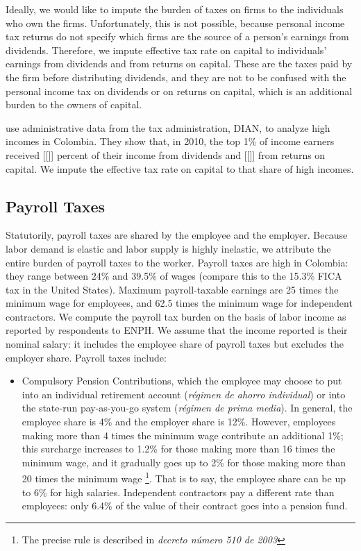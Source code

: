 \documentclass[12pt]{article}
\begin{document}
\begin{appendices}
Ideally, we would like to impute the burden of taxes on firms
to the individuals who own the firms.
Unfortunately, this is not possible,
because personal income tax returns do not specify
which firms are the source of a person's earnings from dividends.
Therefore, we impute effective tax rate on capital
to individuals' earnings from dividends and from returns on capital.
These are the taxes paid by the firm before distributing dividends,
and they are not to be confused with
the personal income tax on dividends or on returns on capital,
which is an additional burden to the owners of capital.

\citet{juliana} use administrative data from the tax administration, DIAN,
to analyze high incomes in Colombia.
They show that, in 2010, the top 1\% of income earners
received [[]] percent of their income from dividends
and [[]] from returns on capital.
We impute the effective tax rate on capital to that share of high incomes.

\subsection{Payroll Taxes}

Statutorily, payroll taxes are shared by the employee and the employer.
Because labor demand is elastic and labor supply is highly inelastic,
we attribute the entire burden of payroll taxes to the worker.
Payroll taxes are high in Colombia:
they range between 24\% and 39.5\% of wages
(compare this to the 15.3\% FICA tax in the United States).
Maximum payroll-taxable earnings are 25 times the minimum wage for employees,
and 62.5 times the minimum wage for independent contractors.
We compute the payroll tax burden on the basis of
labor income as reported by respondents to ENPH.
We assume that the income reported is their nominal salary:
it includes the employee share of payroll taxes
but excludes the employer share.
Payroll taxes include:
\begin{itemize}

\item Compulsory Pension Contributions,
  which the employee may choose to put into an individual retirement account
  (\textit{r\'{e}gimen de ahorro individual})
  or into the state-run pay-as-you-go system
  (\textit{r\'{e}gimen de prima media}).
  In general, the employee share is 4\% and the employer share is 12\%.
  However, employees making more than 4 times the minimum wage
  contribute an additional 1\%; this surcharge increases to 1.2\%
  for those making more than 16 times the minimum wage,
  and it gradually goes up to 2\%
  for those making more than 20 times the minimum wage
  \footnote
      {The precise rule is described in
        \textit{decreto n\'{u}mero 510 de 2003}}.
  That is to say, the employee share can be up to 6\% for high salaries.
  Independent contractors pay a different rate than employees:
  only 6.4\% of the value of their contract goes into a pension fund.


\end{itemize}
\end{appendices}
\end{document}

